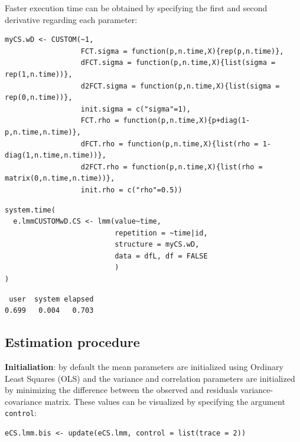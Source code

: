 \documentclass[12pt]{article}
\begin{document}
Faster execution time can be obtained by specifying the first and
second derivative regarding each parameter:
\lstset{language=r,label= ,caption= ,captionpos=b,numbers=none}
\begin{lstlisting}
myCS.wD <- CUSTOM(~1,
                  FCT.sigma = function(p,n.time,X){rep(p,n.time)},
                  dFCT.sigma = function(p,n.time,X){list(sigma = rep(1,n.time))},
                  d2FCT.sigma = function(p,n.time,X){list(sigma = rep(0,n.time))},
                  init.sigma = c("sigma"=1),
                  FCT.rho = function(p,n.time,X){p+diag(1-p,n.time,n.time)},
                  dFCT.rho = function(p,n.time,X){list(rho = 1-diag(1,n.time,n.time))},
                  d2FCT.rho = function(p,n.time,X){list(rho = matrix(0,n.time,n.time))},
                  init.rho = c("rho"=0.5))
\end{lstlisting}

\lstset{language=r,label= ,caption= ,captionpos=b,numbers=none}
\begin{lstlisting}
system.time(
  e.lmmCUSTOMwD.CS <- lmm(value~time,
                          repetition = ~time|id,
                          structure = myCS.wD, 
                          data = dfL, df = FALSE
                          )
)
\end{lstlisting}

\begin{verbatim}
 user  system elapsed 
0.699   0.004   0.703
\end{verbatim}



\clearpage

\subsection{Estimation procedure}
\label{sec:orgfba96a8}

\textbf{Initialiation}: by default the mean parameters are initialized using
 Ordinary Least Squares (OLS) and the variance and correlation
 parameters are initialized by minimizing the difference between the
 observed and residuals variance-covariance matrix. These values can
 be visualized by specifying the argument \texttt{control}:
\lstset{language=r,label= ,caption= ,captionpos=b,numbers=none}
\begin{lstlisting}
eCS.lmm.bis <- update(eCS.lmm, control = list(trace = 2))
\end{lstlisting}
\end{document}
